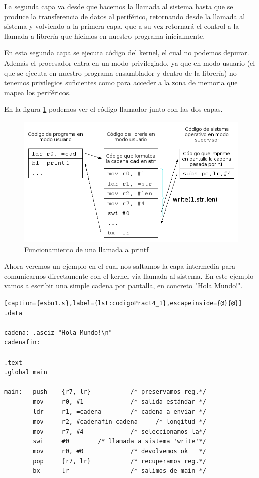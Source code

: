 La segunda capa va desde que hacemos la llamada al sistema hasta que se
produce la transferencia de datos al periférico, retornando desde la llamada
al sistema y volviendo a la primera capa, que a su vez retornará el control
a la llamada a librería que hicimos en nuestro programa inicialmente.

En esta segunda capa se ejecuta código del kernel, el cual no podemos depurar.
Además el procesador entra en un modo privilegiado, ya que en modo usuario (el
que se ejecuta en nuestro programa ensamblador y dentro de la librería) no
tenemos privilegios suficientes como para acceder a la zona de memoria que
mapea los periféricos.

En la figura \ref{fig:capas} podemos ver el código llamador junto con las dos
capas.

\begin{figure}[h]
  \centering
    \includegraphics[width=14cm]{graphs/capas.png}
  \caption{Funcionamiento de una llamada a printf}
  \label{fig:capas}
\end{figure}

Ahora veremos un ejemplo en el cual nos saltamos la capa intermedia para
comunicarnos directamente con el kernel vía llamada al sistema. En este ejemplo
vamos a escribir una simple cadena por pantalla, en concreto "Hola Mundo!".

\begin{lstlisting}[caption={esbn1.s},label={lst:codigoPract4_1},escapeinside={@}{@}]
.data

cadena: .asciz "Hola Mundo!\n"
cadenafin:

.text
.global main
 
main:   push    {r7, lr}           /* preservamos reg.*/
        mov     r0, #1             /* salida estándar */
        ldr     r1, =cadena        /* cadena a enviar */
        mov     r2, #cadenafin-cadena     /* longitud */
        mov     r7, #4             /* seleccionamos la*/
        swi     #0        /* llamada a sistema 'write'*/
        mov     r0, #0             /* devolvemos ok   */
        pop     {r7, lr}           /* recuperamos reg.*/
        bx      lr                 /* salimos de main */
\end{lstlisting}

